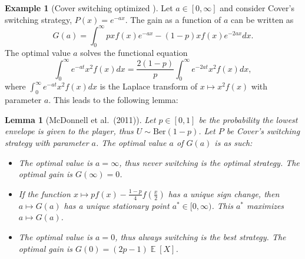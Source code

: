 \documentclass[twoside,a4paper]{article}
\theoremstyle{plain}
\newtheorem{lemma}[theorem]{Lemma}
\theoremstyle{definition}
\newtheorem{example}[theorem]{Example}
\theoremstyle{remark}
\numberwithin{equation}{section}
\DeclareMathOperator{\E}{\mathbb{E}}
\DeclareMathOperator{\1}{\mathbbm{1}}
\begin{document}
\begin{example}[Cover switching optimized \cite{McDonnell11}]
Let $a\in[0,\infty]$ and consider Cover's switching strategy, $P(x)=e^{-ax}$. The gain as a function of $a$ can be written as
\[G(a)=\int_0^\infty pxf(x)e^{-ax}-(1-p)xf(x)e^{-2ax}dx.\]
The optimal value $a$ solves the functional equation
\[\int_0^\infty e^{-at}x^2f(x)dx=\frac{2(1-p)}{p}\int_0^\infty e^{-2at}x^2f(x)dx,\]
where $\int_0^\infty e^{-at}x^2f(x)dx$ is the Laplace transform of $x\mapsto x^2f(x)$ with parameter $a$. This leads to the following lemma:
\begin{lemma}[McDonnell et al.~(2011)]
Let $p\in[0,1]$ be the probability the lowest envelope is given to the player, thus $U\sim\text{Ber}(1-p)$. Let $P$ be Cover's switching strategy with parameter $a$. The optimal value $a$ of $G(a)$ is as such:
\begin{itemize}
	\item[$p\in\left[0,\frac{1}{5}\right)$:] The optimal value is $a=\infty$, thus never switching is the optimal strategy. The optimal gain is $G(\infty)=0$.
	\item[$p\in\left[\frac{1}{5},\frac{2}{3}\right)$:] If the function $x\mapsto pf(x)-\frac{1-p}{4}f\left(\frac{x}{2}\right)$ has a unique sign change, then $a\mapsto G(a)$ has a unique stationary point $a^*\in[0,\infty)$. This $a^*$ maximizes $a\mapsto G(a)$.
	\item[{$p\in\left[\frac{2}{3},1\right]$:}] The optimal value is $a=0$, thus always switching is the best strategy. The optimal gain is $G(0)=(2p-1)\E[X]$.
\end{itemize}
\end{lemma}
\end{example}
\end{document}
